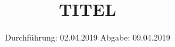 

\subject{V501/2}
\title{TITEL}
\date{%
  Durchführung: 02.04.2019
  \hspace{3em}
  Abgabe: 09.04.2019
}



\maketitle
\thispagestyle{empty}
\tableofcontents
\newpage






\printbibliography{}


